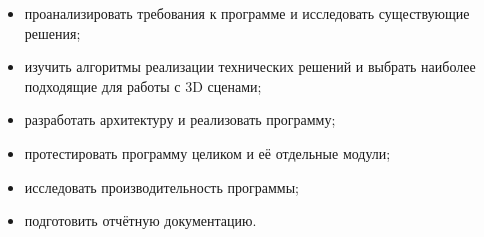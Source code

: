 \begin{itemize}[label=---]
    \item проанализировать требования к программе и исследовать существующие решения;
    
    \item изучить алгоритмы реализации технических решений и выбрать наиболее подходящие для работы с 3D сценами;
    
    \item разработать архитектуру и реализовать программу;
    
    \item протестировать программу целиком и её отдельные модули;
    
    \item исследовать производительность программы;
    
    \item подготовить отчётную документацию.
\end{itemize}

\newpage